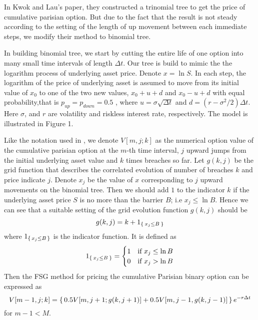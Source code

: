 \documentclass[11pt]{book}
\begin{document}
 In Kwok and Lau's paper\cite{Kwok2001}, they constructed a trinomial tree to get the price of cumulative parisian option. But due to the fact that the result is not steady according to the setting of the length of up movement between each immediate steps, we modify their method to binomial tree. 
 
In building binomial tree, we start by cutting the entire life of one option into many small time intervals of length $\Delta t$. 
Our tree is build to mimic the the logarithm process of underlying asset price. Denote $x=\ln S$. In each step, the logarithm of the price of underlying asset is assumed to move from its initial value of $x_0$ to one of the two new values, $x_0 + u+d$ and $x_0 - u+d$ with equal probability,that is $p_{up} = p_{down} = 0.5$ , where $u = \sigma \sqrt{\Delta t}$ and $d = (r - {\sigma}^2 /2)\Delta t$. Here $\sigma$, and $r$ are volatility and riskless interest rate, respectively. The model is illustrated in Figure 1.  %

Like the notation used in \cite{Kwok2001}, we denote $V[m,j;k]$ as the numerical option value of the cumulative parisian option at the $m$-th time interval,  $j$ upward jumps from the initial underlying asset value and $k$ times breaches so far. Let $g(k,j)$ be the grid function that describes the correlated evolution of number of breaches $k$ and price indicate $j$. Denote $x_j$ be the value of $x$ corresponding to $j$ upward movements on the binomial tree. Then we should add $1$ to the indicator $k$ if the underlying asset price $S$ is no more than the barrier $B$; i.e $x_j \leq \ln B$. Hence we can see that a suitable setting of the grid evolution function $g(k,j)$ should be 
\begin{equation}\label{eq:grid}
g(k,j) = k + 1_{\Set{x_j \leq B}}
\end{equation}
where $1_{\set{x_j \leq B}}$ is the indicator function. It is defined as 
\begin{equation}\label{eq:grid-indicator}
1_{\Set{x_j \leq B}} =  \begin{cases}
1 & \text{if } x_j \leq \ln B \\
0 & \text{if } x_j > \ln B
\end{cases}
\end{equation}
Then the FSG method for pricing the cumulative Parisian binary option can be expressed as
\begin{equation}\label{eq:fsg}
V[m-1,j;k] =\set{0.5V[m,j+1;g(k,j+1)]+0.5V[m,j-1,g(k,j-1)]}e^{-r\Delta t} 
\end{equation}
for $m-1 < M$. 
\end{document}
